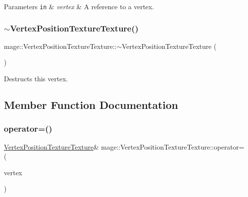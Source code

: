 \begin{DoxyParams}[1]{Parameters}
\mbox{\tt in}  & {\em vertex} & A reference to a vertex. \\
\hline
\end{DoxyParams}
\hypertarget{structmage_1_1_vertex_position_texture_texture_a861ed56f084a3385429eae5783178529}{}\label{structmage_1_1_vertex_position_texture_texture_a861ed56f084a3385429eae5783178529} 
\subsubsection{\texorpdfstring{$\sim$\+Vertex\+Position\+Texture\+Texture()}{~VertexPositionTextureTexture()}}
{\footnotesize\ttfamily mage\+::\+Vertex\+Position\+Texture\+Texture\+::$\sim$\+Vertex\+Position\+Texture\+Texture (\begin{DoxyParamCaption}{ }\end{DoxyParamCaption})\hspace{0.3cm}{\ttfamily [default]}}

Destructs this vertex. 

\subsection{Member Function Documentation}
\hypertarget{structmage_1_1_vertex_position_texture_texture_a6880fca48f99b6a3360a41f05ca7f9fc}{}\label{structmage_1_1_vertex_position_texture_texture_a6880fca48f99b6a3360a41f05ca7f9fc} 
\subsubsection{\texorpdfstring{operator=()}{operator=()}\hspace{0.1cm}{\footnotesize\ttfamily [1/2]}}
{\footnotesize\ttfamily \hyperlink{structmage_1_1_vertex_position_texture_texture}{Vertex\+Position\+Texture\+Texture}\& mage\+::\+Vertex\+Position\+Texture\+Texture\+::operator= (\begin{DoxyParamCaption}\item[{const \hyperlink{structmage_1_1_vertex_position_texture_texture}{Vertex\+Position\+Texture\+Texture} \&}]{vertex }\end{DoxyParamCaption})\hspace{0.3cm}{\ttfamily [default]}}

